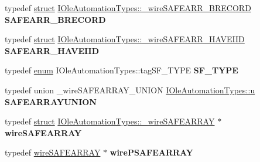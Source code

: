 \begin{DoxyCompactItemize}
\item 
\mbox{\label{interface_i_ole_automation_types_ab7c8439aae666ef5702e6a3cc433056c}} 
typedef \hyperlink{interfacestruct}{struct} \hyperlink{struct_i_ole_automation_types_1_1__wire_s_a_f_e_a_r_r___b_r_e_c_o_r_d}{I\+Ole\+Automation\+Types\+::\+\_\+wire\+S\+A\+F\+E\+A\+R\+R\+\_\+\+B\+R\+E\+C\+O\+RD} {\bfseries S\+A\+F\+E\+A\+R\+R\+\_\+\+B\+R\+E\+C\+O\+RD}
\item 
\mbox{\label{interface_i_ole_automation_types_ad3c8f96d1fddcbf521e75e3baed01f75}} 
typedef \hyperlink{interfacestruct}{struct} \hyperlink{struct_i_ole_automation_types_1_1__wire_s_a_f_e_a_r_r___h_a_v_e_i_i_d}{I\+Ole\+Automation\+Types\+::\+\_\+wire\+S\+A\+F\+E\+A\+R\+R\+\_\+\+H\+A\+V\+E\+I\+ID} {\bfseries S\+A\+F\+E\+A\+R\+R\+\_\+\+H\+A\+V\+E\+I\+ID}
\item 
\mbox{\label{interface_i_ole_automation_types_a2b4b5987d31ef8cd24a7db69363a8a53}} 
typedef \hyperlink{interfaceenum}{enum} I\+Ole\+Automation\+Types\+::tag\+S\+F\+\_\+\+T\+Y\+PE {\bfseries S\+F\+\_\+\+T\+Y\+PE}
\item 
\mbox{\label{interface_i_ole_automation_types_ab80881ce3e15d156d81b83a0b9a1ba9a}} 
typedef union \+\_\+wire\+S\+A\+F\+E\+A\+R\+R\+A\+Y\+\_\+\+U\+N\+I\+ON \hyperlink{union_i_ole_automation_types_1_1u}{I\+Ole\+Automation\+Types\+::u} {\bfseries S\+A\+F\+E\+A\+R\+R\+A\+Y\+U\+N\+I\+ON}
\item 
\mbox{\label{interface_i_ole_automation_types_ad62a5a1eb3c9b9eee2014d6a76b0807c}} 
typedef \hyperlink{interfacestruct}{struct} \hyperlink{struct_i_ole_automation_types_1_1__wire_s_a_f_e_a_r_r_a_y}{I\+Ole\+Automation\+Types\+::\+\_\+wire\+S\+A\+F\+E\+A\+R\+R\+AY} $\ast$ {\bfseries wire\+S\+A\+F\+E\+A\+R\+R\+AY}
\item 
\mbox{\label{interface_i_ole_automation_types_aa90f888499df079d37b0974a414476f6}} 
typedef \hyperlink{struct_i_ole_automation_types_1_1__wire_s_a_f_e_a_r_r_a_y}{wire\+S\+A\+F\+E\+A\+R\+R\+AY} $\ast$ {\bfseries wire\+P\+S\+A\+F\+E\+A\+R\+R\+AY}
\item 
\mbox{\label{interface_i_ole_automation_types_a57aa0020a26833a6ae17334c101f65b9}} 

\end{DoxyCompactItemize}
